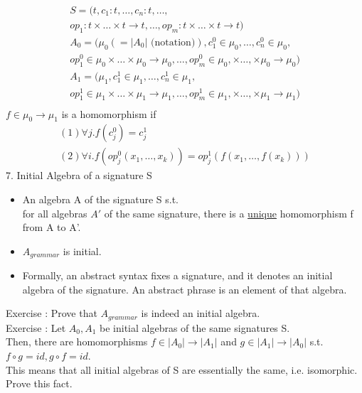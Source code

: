 \documentclass{article}[12pt]
\begin{document}
\begin{align*}
    S=(t, c_1:t, \ldots, c_n:t, \ldots, \\
    op_1 :t\times \ldots \times t \rightarrow t , \ldots, op_m : t \times \ldots \times t \rightarrow t) \\
    A_0 = (\mu_0(=|A_0|\text{ (notation)}), c_1^0 \in \mu_0, \ldots, c_n^0 \in \mu_0, \\
    op_1^0 \in \mu_0 \times \ldots \times \mu_0 \rightarrow \mu_0, \ldots, op_m^0 \in \mu_0, \times \ldots, \times \mu_0 \rightarrow \mu_0) \\
    A_1 = (\mu_1, c_1^1 \in \mu_1, \ldots, c_n^1 \in \mu_1, \\
    op_1^1 \in \mu_1 \times \ldots \times \mu_1 \rightarrow \mu_1, \ldots, op_m^1 \in \mu_1, \times \ldots, \times \mu_1 \rightarrow \mu_1) \\
\end{align*}
$f\in \mu_0 \rightarrow \mu_1$ is a homomorphism if
\begin{align*}
    (1) \forall j. f(c_j^0) = c_j^1  \\
    (2) \forall i. f(op_j^0(x_1, \ldots, x_k)) = op_j^1 (f(x_1, \ldots, f(x_k)))
\end{align*}
7. Initial Algebra of a signature S\\
\begin{itemize}
    \item An algebra A of the signature S s.t. \\
    for all algebras $A'$ of the same signature, there is a \underline{unique} homomorphism f from A to A'.
    \item $A_{grammar}$ is initial.
    \item Formally, an abstract syntax fixes a signature, and it denotes an initial algebra of the signature. An abstract phrase is an element of that algebra.
\end{itemize}
Exercise : Prove that $A_{grammar}$ is indeed an initial algebra. \\
Exercise : Let $A_0, A_1$ be initial algebras of the same signatures S. \\
Then, there are homomorphisms $f\in |A_0| \rightarrow |A_1|$ and $g \in |A_1| \rightarrow |A_0|$ s.t. $f\circ g = id, g\circ f = id$. \\
This means that all initial algebras of S are essentially the same, i.e. isomorphic. Prove this fact.
\end{document}
